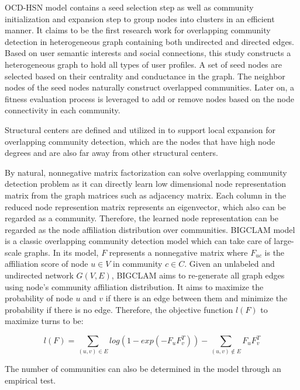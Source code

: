 OCD-HSN model \cite{huang2018overlapping} contains a seed selection step as well as community initialization and expansion step to group nodes into clusters in an efficient manner. It claims to be the first research work for overlapping community detection in heterogeneous graph containing both undirected and directed edges. Based on user semantic interests and social connections, this study constructs a heterogeneous graph to hold all types of user profiles. A set of seed nodes are selected based on their centrality and conductance in the graph. The neighbor nodes of the seed nodes naturally  construct overlapped communities. Later on, a fitness evaluation process is leveraged to add or remove nodes  based on the node connectivity in each community. 

Structural centers are defined and utilized in \cite{wang2017overlapping} to support local expansion for overlapping community detection, which are the nodes that have high node degrees and are also far away from other structural centers.


By natural, nonnegative matrix factorization can solve overlapping community detection problem as it can directly learn low dimensional node representation matrix from the graph matrices such as adjacency matrix. Each column in the reduced node represention matrix represents an eigenvector, which also can be regarded as a community. Therefore, the learned node representation can be regarded as the node affiliation distribution over communities. BIGCLAM model \cite{yang2013overlapping} is a classic overlapping community detection model which can take care of large-scale graphs. In its model, $F$ represents a nonnegative matrix where $F_{uc}$ is the affiliation score of node $u \in V$ in community $c \in C$. Given an unlabeled and undirected network $G(V, E)$, BIGCLAM aims to re-generate all graph edges using node's community affiliation distribution. It aims to maximize the probability of node $u$ and $v$ if there is an edge between them and minimize the probability if there is no edge.  Therefore, the objective function $l(F)$ to maximize turns to be:

\begin{equation}
l(F) = \sum_{(u,v) \in E} log(1-exp(-F_uF_v^T)) - \sum_{(u,v) \notin E} F_uF_v^T
\end{equation}

The number of communities can also be determined in the model through an empirical test.
 
